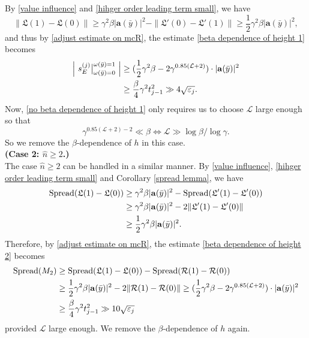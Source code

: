 \documentclass[11pt,reqno,UTF8,twoside]{amsart}
\newcommand{\bfa}{\mathbf{a}}
\newcommand{\spread}{{\rm Spread}}
\newcommand{\mcR}{\mathcal{R}}
\newcommand{\mcL}{\mathcal{L}}
\newcommand{\whn}{\widehat{n}}
\newcommand{\smallSj}{s^{(j)}}
\theoremstyle{definition}
\numberwithin{equation}{section}
\begin{document}
  By \eqref{value influence} and \eqref{hihger order leading term small}, we have 
  \[\|\mathfrak{L}(1)-\mathfrak{L}(0) \|\geq \gamma^2 \beta |\bfa(\bar{y})|^2  - \| \mathfrak{L}'(0) -\mathfrak{L}'(1)\| \geq \frac{1}{2}\gamma^2 \beta |\bfa(\bar{y}) |^2, \]
  and thus by \eqref{adjust estimate on mcR}, the estimate \eqref{beta dependence of height 1} becomes 
  \begin{align}\label{no beta dependence of height 1}
 \notag \left| \  \smallSj_E \big|_{\omega(\bar{y})=0}^{\omega(\bar{y})=1} \ \right| & \geq (\frac{1}{2}\gamma^2 \beta -2\gamma^{0.85(\mcL+2)})\cdot |\bfa(\bar{y})|^2 \\
            &\geq \frac{\beta}{4}\gamma^2 t^2_{j-1}\gg  4\sqrt{\varepsilon_{j}}.
  \end{align}
  Now, \eqref{no beta dependence of height 1} only requires us to  choose $\mcL$ large enough  so that 
  \[ \gamma^{0.85(\mcL+2)-2}\ll \beta \Leftrightarrow \mcL\gg \log \beta / \log \gamma.\]
  So we remove the $\beta$-dependence of $h$ in this case.\\


  \noindent \textbf{(Case 2: $\whn\geq 2$.)}\\

  The case $\whn\geq 2$ can be handled in a similar manner. By \eqref{value influence}, \eqref{hihger order leading term small} and Corollary \ref{spread lemma}, we have 
  \begin{align*}
    \spread(\mathfrak{L}(1)-\mathfrak{L}(0)) &\geq  \gamma^2 \beta |\bfa(\bar{y})|^2 -\spread(\mathfrak{L}'(1)-\mathfrak{L}'(0)) \\
                               &\geq  \gamma^2 \beta |\bfa(\bar{y})|^2 -2\| \mathfrak{L}'(1)-\mathfrak{L}'(0)\| \\
                               &\geq  \frac{1}{2} \gamma^2 \beta |\bfa(\bar{y})|^2.
  \end{align*}
  Therefore, by \eqref{adjust estimate on mcR}, the estimate \eqref{beta dependence of height 2} becomes 
  \begin{align}\label{no beta dependence of height 2}
\notag  \spread(M_2)& \geq \spread(\mathfrak{L}(1)-\mathfrak{L}(0))-\spread(\mcR(1)-\mcR(0)) \\
   \notag & \geq \frac{1}{2}\gamma^2 \beta |\bfa(\bar{y})|^2- 2\| \mcR(1)-\mcR(0)\| \geq (\frac{1}{2}\gamma^2 \beta -2\gamma^{0.85(\mcL+2)})\cdot |\bfa(\bar{y})|^2  \\
      &\geq   \frac{\beta}{4}\gamma^2 t^2_{j-1} \gg 10\sqrt{\varepsilon_{j}}
\end{align}
provided  $\mcL$ large enough. We remove the $\beta$-dependence of $h$ again.
\end{document}
